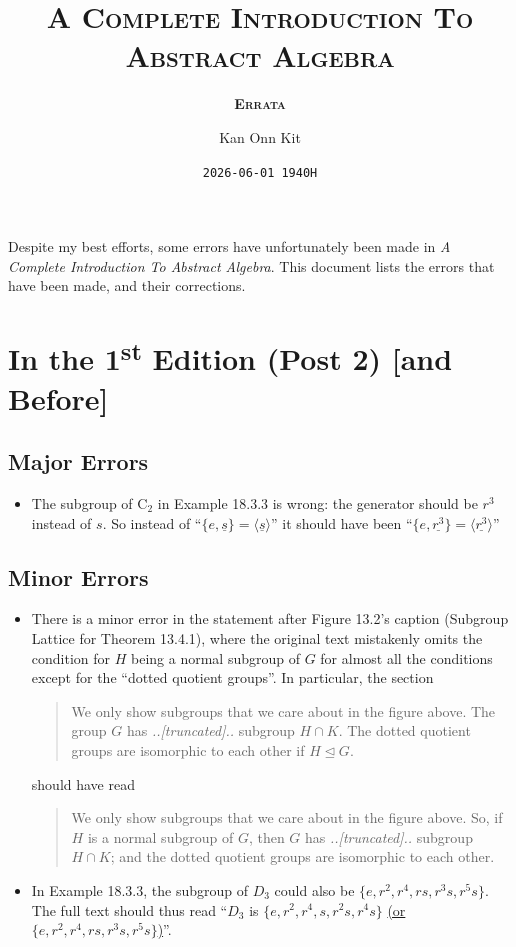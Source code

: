 \documentclass[
    a4paper,
    chapterprefix,
    DIV=9
]{scrartcl}
\title{\bfseries\scshape A Complete Introduction To\\Abstract Algebra}
\subtitle{\bfseries\scshape Errata}
\date{\texttt{2026-06-01 1940H}}
\author{Kan Onn Kit}
\begin{document}
\maketitle

Despite my best efforts, some errors have unfortunately been made in \textit{A Complete Introduction To Abstract Algebra}. This document lists the errors that have been made, and their corrections.

\section*{In the 1\textsuperscript{st} Edition (Post 2) [and Before]}
\subsection*{Major Errors}
\begin{itemize}
    \item The subgroup of $\mathrm{C}_2$ in Example 18.3.3 is wrong: the generator should be $r^3$ instead of $s$. So instead of ``$\{e, \underline{s}\} = \langle \underline{s} \rangle$'' it should have been ``$\{e, \underline{r^3}\} = \langle \underline{r^3} \rangle$''
\end{itemize}

\subsection*{Minor Errors}
\begin{itemize}
    \item There is a minor error in the statement after Figure 13.2's caption (Subgroup Lattice for Theorem 13.4.1), where the original text mistakenly omits the condition for $H$ being a normal subgroup of $G$ for almost all the conditions except for the ``dotted quotient groups''. In particular, the section
    \begin{quote}
        We only show subgroups that we care about in the figure above. The group $G$ has \textit{..[truncated]..} subgroup $H\cap K$. The dotted quotient groups are isomorphic to each other if $H \unlhd G$.
    \end{quote}
    should have read
    \begin{quote}
        We only show subgroups that we care about in the figure above. So, if $H$ is a normal subgroup of $G$, then $G$ has \textit{..[truncated]..} subgroup $H\cap K$; and the dotted quotient groups are isomorphic to each other.
    \end{quote}
    \item In Example 18.3.3, the subgroup of $D_3$ could also be $\{e, r^2, r^4, rs, r^3s, r^5s\}$. The full text should thus read ``$D_3$ is $\{e, r^2, r^4, s, r^2s, r^4s\}$ \underline{(or $\{e, r^2, r^4, rs, r^3s, r^5s\}$)}''.
\end{itemize}
\end{document}
